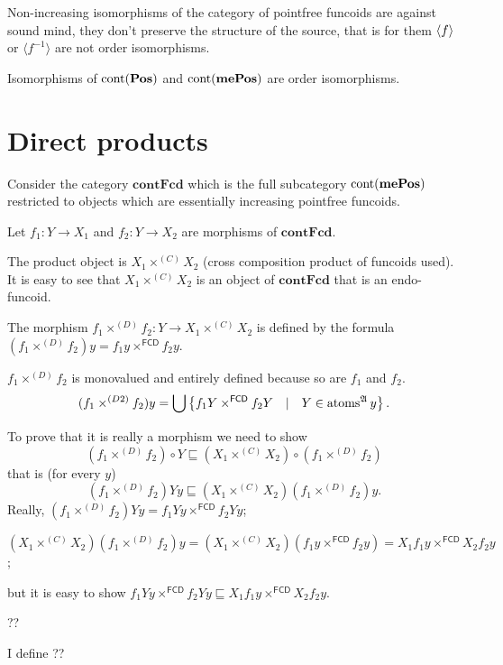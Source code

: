 \begin{rem}
  Non-increasing isomorphisms of the category of pointfree funcoids are
  against sound mind, they don't preserve the structure of the source, that is
  for them $\left\langle f\right\rangle$ or $\langle f^{- 1} \rangle$ are not order
  isomorphisms.
\end{rem}

\begin{obvious}
Isomorphisms of $\operatorname{cont} (\mathbf{Pos})$ and
$\operatorname{cont} (\mathbf{mePos})$ are order
isomorphisms.
\end{obvious}

\section{Direct products}


Consider the category $\mathbf{contFcd}$ which is the full
subcategory $\operatorname{cont} (\mathbf{mePos})$ restricted to
objects which are essentially increasing pointfree funcoids.

Let $f_1 : Y \rightarrow X_1$ and $f_2 : Y \rightarrow X_2$ are morphisms of
$\mathbf{contFcd}$.

The product object is $X_1 \times^{(C)} X_2$ (cross composition product of
funcoids used). It is easy to see that $X_1 \times^{(C)} X_2$ is an object of
$\mathbf{contFcd}$ that is an endo-funcoid.

The morphism $f_1 \times^{(D)} f_2 : Y \rightarrow X_1 \times^{(C)} X_2$ is
defined by the formula $(f_1 \times^{(D)} f_2) y = f_1 y
\times^{\mathsf{FCD}} f_2 y$.

$f_1 \times^{(D)} f_2$ is monovalued and entirely defined because so are $f_1$
and $f_2$.
\[ (f_1 \times^{(D 2)} f_2) y = \bigcup \left\{ f_1 Y
   \times^{\mathsf{FCD}} f_2 Y \hspace{1em} | \hspace{1em} Y \in
   \operatorname{atoms}^{\mathfrak{A}} y \right\} . \]


To prove that it is really a morphism we need to show
\[ (f_1 \times^{(D)} f_2) \circ Y \sqsubseteq (X_1 \times^{(C)} X_2) \circ
   (f_1 \times^{(D)} f_2) \]
that is (for every $y$)
\[ (f_1 \times^{(D)} f_2) Y y \sqsubseteq (X_1 \times^{(C)} X_2) (f_1
   \times^{(D)} f_2) y. \]
Really, $(f_1 \times^{(D)} f_2) Y y = f_1 Y y \times^{\mathsf{FCD}} f_2
Y y$;

$(X_1 \times^{(C)} X_2) (f_1 \times^{(D)} f_2) y = (X_1 \times^{(C)} X_2) (f_1
y \times^{\mathsf{FCD}} f_2 y) = X_1 f_1 y \times^{\mathsf{FCD}}
X_2 f_2 y$;

but it is easy to show $f_1 Y y \times^{\mathsf{FCD}} f_2 Y y
\sqsubseteq X_1 f_1 y \times^{\mathsf{FCD}} X_2 f_2 y$.

??

I define ??

